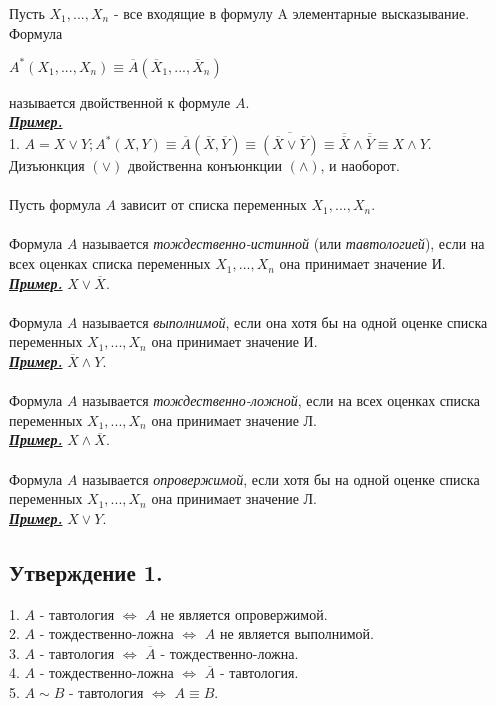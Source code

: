 \documentclass{article}
\begin{document}
	Пусть $X_1, ..., X_n$ - все входящие в формулу A элементарные высказывание. Формула
	\begin{center}
		$A^* (X_1, ..., X_n) \equiv \overline{A} (\overline{X}_1, ..., \overline{X}_n)$
	\end{center}
	называется двойственной к формуле $A$.\\
	\underline{\textit{\textbf{Пример.}}}\\
	1. $A = X \vee Y; A^* (X, Y) \equiv \overline{A} (\overline{X}, \overline{Y}) \equiv \overline{(\overline{X} \vee \overline{Y})} \equiv \overline{\overline{X}} \wedge \overline{\overline{Y}} \equiv X \wedge Y.$\\
	Дизъюнкция $(\vee)$ двойственна конъюнкции $(\wedge)$, и наоборот.
	\\\\
	Пусть формула $A$ зависит от списка переменных $X_1, ..., X_n.$
	\\\\
	Формула $A$ называется \textit{тождественно-истинной} (или \textit{тавтологией}),
	если на всех оценках списка переменных $X_1, ..., X_n$ она принимает значение И.\\
	\underline{\textit{\textbf{Пример.}}} $X \vee \overline{X}.$
	\\\\
	Формула $A$ называется \textit{выполнимой}, если она хотя бы на одной оценке списка
	переменных $X_1, ..., X_n$ она принимает значение И.\\
	\underline{\textit{\textbf{Пример.}}} $\overline{X} \wedge Y.$
	\\\\
	Формула $A$ называется \textit{тождественно-ложной}, если на всех оценках списка
	переменных $X_1, ..., X_n$ она принимает значение Л.\\
	\underline{\textit{\textbf{Пример.}}} $X \wedge \overline{X}.$
	\\\\
	Формула $A$ называется \textit{опровержимой}, если хотя бы на одной оценке списка
	переменных $X_1, ..., X_n$ она принимает значение Л.\\
	\underline{\textit{\textbf{Пример.}}} $X \vee Y.$
	
	\newpage
	\subsection*{Утверждение 1.}
	1. $A$ - тавтология $\Leftrightarrow$ $A$ не является опровержимой.\\
	2. $A$ - тождественно-ложна $\Leftrightarrow$ $A$ не является выполнимой.\\
	3. $A$ - тавтология $\Leftrightarrow$ $\overline{A}$ - тождественно-ложна.\\
	4. $A$ - тождественно-ложна $\Leftrightarrow$ $\overline{A}$ - тавтология.\\
	5. $A \sim B$ - тавтология $\Leftrightarrow$ $A \equiv B.$
	
\end{document}
